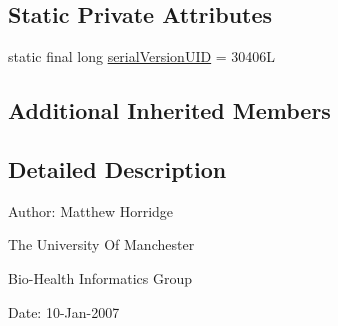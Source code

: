 \subsection*{Static Private Attributes}
\begin{DoxyCompactItemize}
\item 
static final long \hyperlink{classorg_1_1coode_1_1owlapi_1_1obo_1_1parser_1_1_o_b_o_ontology_format_ae7de80098edfd84ad4dcc359fc30938f}{serial\-Version\-U\-I\-D} = 30406\-L
\end{DoxyCompactItemize}
\subsection*{Additional Inherited Members}


\subsection{Detailed Description}
Author\-: Matthew Horridge\par
 The University Of Manchester\par
 Bio-\/\-Health Informatics Group\par
 Date\-: 10-\/\-Jan-\/2007\par
\par
 

